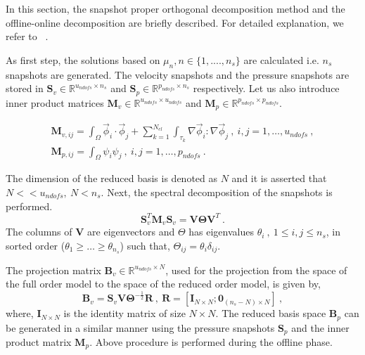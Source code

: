 \documentclass[graybox]{svmult}
\begin{document}
In this section, the snapshot proper orthogonal decomposition method and the offline-online decomposition are briefly described. For detailed explanation, we refer to ~\cite{CRBM}.

As first step, the solutions based on $\mu_n, n \in \lbrace 1,....,n_s \rbrace$ are calculated i.e. $n_s$ snapshots are generated. The velocity snapshots and the pressure snapshots are stored in $\bm{S}_v \in \mathbb{R}^{u_{ndofs} \times n_s}$ and $\bm{S}_p \in \mathbb{R}^{p_{ndofs} \times n_s}$ respectively. Let us also introduce inner product matrices $\bm{M}_v \in \mathbb{R}^{u_{ndofs} \times u_{ndofs}}$ and $\bm{M}_p \in \mathbb{R}^{p_{ndofs} \times p_{ndofs}}$.

\begin{gather*}
\bm{M}_{v,ij} = \int_{\Omega} \overrightarrow{\phi}_i \cdot \overrightarrow{\phi}_j + \sum_{k=1}^{N_{el}} \int_{\tau_k} \nabla \overrightarrow{\phi}_i : \nabla \overrightarrow{\phi}_j \ , \ i,j = 1, \ldots, u_{ndofs} \ , \\
\bm{M}_{p,ij} = \int_{\Omega} \psi_i \psi_j \ , \ i,j = 1, \ldots, p_{ndofs} \ .
\end{gather*}

The dimension of the reduced basis is denoted as $N$ and it is asserted that $N << u_{ndofs}, \ N < n_s$. Next, the spectral decomposition of the snapshots is performed.
\begin{equation}\label{snapshot_eigen_value}
\bm{S}_v^T \bm{M}_v \bm{S}_v = \bm{V} \bm{\Theta} \bm{V}^T \ .
\end{equation}
The columns of $\bm{V}$ are eigenvectors and $\Theta$ has eigenvalues $\theta_i \ , \ 1 \leq i,j \leq n_s$, in sorted order ($\theta_1 \geq \ldots \geq \theta_{n_s}$) such that, $\Theta_{ij} = \theta_i \delta_{ij}$.

The projection matrix $\bm{B}_v \in \mathbb{R}^{u_{ndofs} \times N}$, used for the projection from the space of the full order model to the space of the reduced order model, is given by, 
\begin{equation}
\bm{B}_v = \bm{S}_v \bm{V} \bm{\Theta}^{-\frac{1}{2}} \bm{R} \ , \ \bm{R} = [\bm{I}_{N \times N} ; \bm{0}_{(n_s-N) \times N}] \ ,
\end{equation}
where, $\bm{I}_{N \times N}$ is the identity matrix of size $N \times N$.
The reduced basis space $\bm{B}_p$ can be generated in a similar manner using the pressure snapshots $\bm{S}_p$ and the inner product matrix $\bm{M}_p$. Above procedure is performed during the offline phase.
\end{document}
